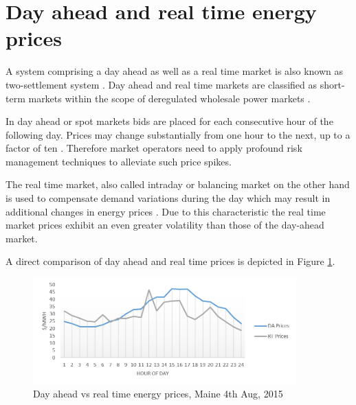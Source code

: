 



\section{Day ahead and real time energy prices} \label{sec:day_ahead_and_real_time_energy_prices}

A system comprising a day ahead as well as a real time market is also known as two-settlement system \cite{lambert2001creating}. Day ahead and real time markets are classified as short-term markets within the scope of deregulated wholesale power markets \cite{hogan1993competitive}. 

In day ahead or spot markets bids are placed for each consecutive hour of the following day. Prices may change substantially from one hour to the next, up to a factor of ten \cite{huisman2007hourly,weron2004modeling}. Therefore market operators need to apply profound risk management techniques to alleviate such price spikes.

The real time market, also called intraday or balancing market on the other hand is used to compensate demand variations during the day which may result in additional changes in energy prices \cite{barroso2005classification}. 
Due to this characteristic the real time market prices exhibit an even greater volatility than those of the day-ahead market. 

A direct comparison of day ahead and real time prices is depicted in Figure \ref{fig:da_vs_rt_prices_maine}.

\begin{figure}[!htbp]
	\centering
		\includegraphics[width=0.90\textwidth]{figures/data_analysis/day_ahead_vs_real_time_prices.png}
	\caption{Day ahead vs real time energy prices, Maine 4th Aug, 2015}
	\label{fig:da_vs_rt_prices_maine}
\end{figure}

